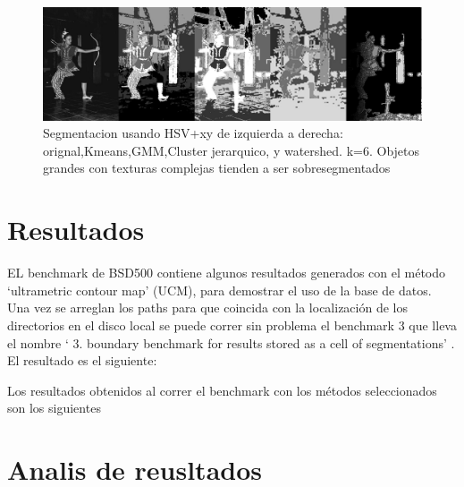 \documentclass[10pt,twocolumn,letterpaper]{article}
\begin{document}
\begin{figure}
\begin{center}
\includegraphics[width=0.95\linewidth]
                   {img/woman.jpg}
\end{center}
   \caption{Segmentacion usando HSV+xy de izquierda a derecha: orignal,Kmeans,GMM,Cluster jerarquico, y watershed. k=6. Objetos grandes con texturas complejas tienden a ser sobresegmentados}
\label{fig:pyra}
\end{figure}


\section{Resultados}

EL benchmark de BSD500 contiene algunos resultados generados con el método ‘ultrametric contour map’ (UCM), para demostrar el uso de la base de datos. Una vez se arreglan los paths para que coincida con la localización de los directorios en el disco local se puede correr sin problema el benchmark 3 que lleva el nombre ‘ 3. boundary benchmark for results stored as a cell of segmentations’ . El resultado es el siguiente:


Los resultados obtenidos al correr el benchmark con los métodos seleccionados son los siguientes

\section{Analis de reusltados}
\end{document}
